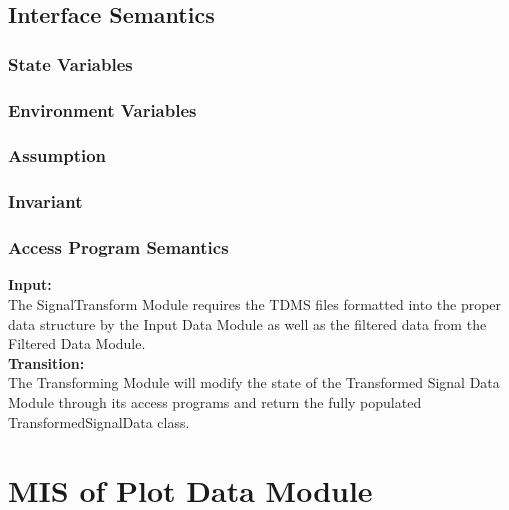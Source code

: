 \documentclass[12pt]{article}
\begin{document}
\subsection{Interface Semantics}
\subsubsection{State Variables}
\subsubsection{Environment Variables}
\subsubsection{Assumption}
\subsubsection{Invariant}
\subsubsection{Access Program Semantics}
\textbf{Input:}\\
The SignalTransform Module requires the TDMS files formatted into the proper
data structure by the Input Data Module as well as the filtered data 
from the Filtered Data Module.\\
\textbf{Transition:}\\
The Transforming Module will modify the state of the Transformed Signal Data
Module through its access programs and return the fully populated
TransformedSignalData class. 

\section{MIS of Plot Data Module}
\end{document}
